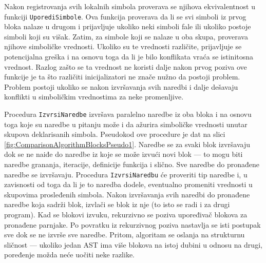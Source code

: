 Nakon registrovanja svih lokalnih simbola proverava se njihova ekvivalentnost u funkciji \texttt{UporediSimbole}. Ova funkcija proverava da li se svi simboli iz prvog bloka nalaze u drugom i prijavljuje ukoliko neki simboli fale ili ukoliko postoje simboli koji su višak. Zatim, za simbole koji se nalaze u oba skupa, proverava njihove simboličke vrednosti. Ukoliko su te vrednosti različite, prijavljuje se potencijalna greška i na osnovu toga da li je bilo konflikata vraća se istinitosna vrednost. Razlog zašto se ta vrednost ne koristi dalje nakon prvog poziva ove funkcije je ta što različiti inicijalizatori ne znače nužno da postoji problem. Problem postoji ukoliko se nakon izvršavanja svih naredbi i dalje dešavaju konflikti u simboličkim vrednostima za neke promenljive. 

Procedura \texttt{IzvrsiNaredbe} izvršava paralelno naredbe iz oba bloka i na osnovu toga koje su naredbe u pitanju može i da ažurira simboličke vrednosti unutar skupova deklarisanih simbola. Pseudokod ove procedure je dat na slici \ref{fig:ComparisonAlgorithmBlocksPseudo1}. Naredbe se za svaki blok izvršavaju dok se ne naiđe do naredbe iz koje se može izvući novi blok --- to mogu biti naredbe grananja, iteracije, definicije funkcija i slično. Sve naredbe do pronađene naredbe se izvršavaju. Procedura \texttt{IzvrsiNaredbu} će proveriti tip naredbe i, u zavisnosti od toga da li je to naredba dodele, eventualno promeniti vrednosti u skupovima prosleđenih simbola. Nakon izvršavanja svih naredbi do pronađene naredbe koja sadrži blok, izvlači se blok iz nje (to isto se radi i za drugi program). Kad se blokovi izvuku, rekurzivno se poziva upoređivač blokova za pronađene parnjake. Po povratku iz rekurzivnog poziva nastavlja se isti postupak sve dok se ne izvrše sve naredbe. Pritom, algoritam se oslanja na strukturnu sličnost --- ukoliko jedan AST ima više blokova na istoj dubini u odnosu na drugi, poređenje možda neće uočiti neke razlike.

